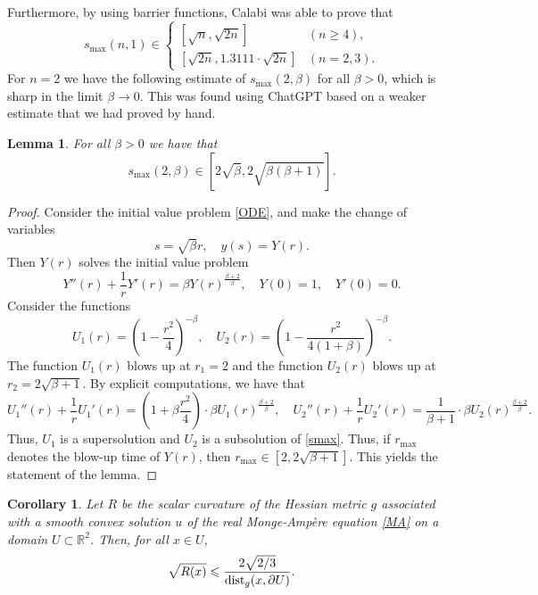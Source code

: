 \documentclass[11pt,reqno]{amsart}
\renewcommand{\leq}{\leqslant}
\renewcommand{\geq}{\geqslant}
\theoremstyle{plain}
\newtheorem{lemma}[theorem]{Lemma}
\newtheorem{corollary}[theorem]{Corollary}
\theoremstyle{definition}
\numberwithin{equation}{section}
\begin{document}
Furthermore, by using barrier functions, Calabi \cite[Eq. 3.13]{EC} was able to prove that
\begin{equation}\label{eq:smax:est}
s_{\max}(n,1) \in \begin{cases}
    [\sqrt{n},\sqrt{2n}] &   (n\geq 4),  \\
    [\sqrt{2n}, 1.3111 \cdot \sqrt{2n}]&  (n=2,3).\end{cases}
    \end{equation}
For $n=2$ we have the following estimate of $s_{\max}(2,\beta)$ for all $\beta > 0$, which is sharp in the limit $\beta \to 0$.
This was found using ChatGPT based on a weaker estimate that we had proved by hand.

\begin{lemma}\label{2beta}
For all $\beta > 0$ we have that 
$$s_{\max}(2,\beta) \in [2\sqrt{\beta}, 2\sqrt{\beta(\beta+1)}].$$
\end{lemma}

\begin{proof}
     Consider the initial value problem \eqref{ODE}, and make the change of variables
$$s=\sqrt{\beta}r,\quad  y(s)=Y(r).$$
Then $Y(r)$ solves the initial value problem
\begin{equation}\label{smax}
Y''(r)+\frac{1}{r}Y'(r)=\beta Y(r)^{\frac{\beta+2}{\beta}},\quad 
Y(0)=1,\quad  Y'(0)=0.
\end{equation}
Consider the functions
$$U_{1}(r)=\left(1-\frac{r^2}{4}\right)^{-\beta},\quad  U_{2}(r)=\left(1-\frac{r^2}{4(1+\beta)}\right)^{-\beta}.$$
The function $U_{1}(r)$ blows up at $r_{1}=2$ and the function $U_{2}(r)$ blows up at $r_{2}=2\sqrt{\beta+1}$. By explicit computations, we have that
$$U_{1}''(r)+\frac{1}{r}U_{1}'(r) = \left(1+\beta \frac{r^2}{4}\right) \cdot \beta U_{1}(r)^{\frac{\beta+2}{\beta}},\quad  U_{2}''(r)+\frac{1}{r}U_{2}'(r)= \frac{1}{\beta+1}\cdot \beta U_{2}(r)^{\frac{\beta+2}{\beta}}.$$
Thus, $U_{1}$ is a supersolution and $U_{2}$ is a subsolution of \eqref{smax}. Thus, if $r_{\max}$ denotes the blow-up time of $Y(r)$, then $r_{\max} \in [2,2\sqrt{\beta+1}]$. This yields the statement of the lemma.
\end{proof}

\begin{corollary}\label{cor:cal:improved:c}
Let $R$ be the scalar curvature of the Hessian metric $g$ associated with a smooth convex solution $u$ of the real Monge-Ampère equation
\eqref{MA} on a domain $U \subset \mathbb{R}^2$. Then, for all $x \in U$,
$$\sqrt{R(x)}\leq \frac{2\sqrt{2/3}}{{\rm dist}_g(x,\partial U)}.$$
\end{corollary}
\end{document}
